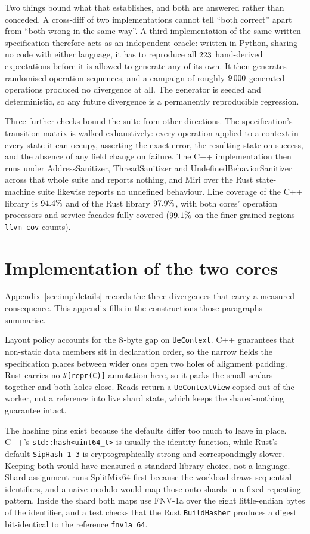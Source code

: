 \documentclass[english,oneside,a4paper,censored,csm,software-track-2020]{HYthesisML}
\begin{document}
\begin{appendices}
Two things bound what that establishes, and both are answered rather than conceded. A cross-diff
of two implementations cannot tell ``both correct'' apart from ``both wrong in the same way''. A
third implementation of the same written specification therefore acts as an independent oracle:
written in Python, sharing no code with either language, it has to reproduce all $223$
hand-derived expectations before it is allowed to generate any of its own. It then generates
randomised operation sequences, and a campaign of roughly $9\,000$ generated operations
produced no divergence at all. The generator is seeded and deterministic, so any future
divergence is a permanently reproducible regression.

Three further checks bound the suite from other directions. The specification's transition matrix
is walked exhaustively: every operation applied to a context in every state it can occupy,
asserting the exact error, the resulting state on success, and the absence of any field change on
failure. The C++ implementation then runs under AddressSanitizer, ThreadSanitizer and
UndefinedBehaviorSanitizer across that whole suite and reports nothing, and Miri over the Rust
state-machine suite likewise reports no undefined behaviour. Line coverage of the C++ library is
$94.4\%$ and of the Rust library $97.9\%$, with both cores' operation processors
and service facades fully covered ($99.1\%$ on the finer-grained regions
\texttt{llvm-cov} counts).


\section{Implementation of the two cores\label{appendix:impl}}
Appendix~\ref{sec:impldetails} records the three divergences that carry a measured consequence.
This appendix fills in the constructions those paragraphs summarise.

Layout policy accounts for the $8$-byte gap on \texttt{UeContext}. C++ guarantees
that non-static data members sit in declaration order, so the narrow fields the specification
places between wider ones open two holes of alignment padding. Rust carries no
\texttt{\#[repr(C)]} annotation here, so it packs the small scalars together and both holes
close. Reads return a \texttt{UeContextView} copied out of the worker, not a reference into live
shard state, which keeps the shared-nothing guarantee intact.

The hashing pins exist because the defaults differ too much to leave in place. C++'s
\texttt{std::hash<uint64\_t>} is usually the identity function, while Rust's default
\texttt{SipHash-1-3} is cryptographically strong and correspondingly slower. Keeping both would have
measured a standard-library choice, not a language. Shard assignment runs SplitMix64 first
because the workload draws sequential identifiers, and a naive modulo would map those onto shards
in a fixed repeating pattern. Inside the shard both maps use FNV-1a over the eight little-endian
bytes of the identifier, and a test checks that the Rust \texttt{BuildHasher} produces a digest
bit-identical to the reference \texttt{fnv1a\_64}.


\end{appendices}
\end{document}
